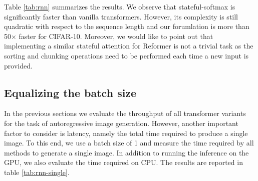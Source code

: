 \documentclass{article}
\begin{document}
Table \ref{tab:rnn} summarizes the results. We observe that stateful-softmax is
significantly faster than vanilla transformers. However, its complexity is
still quadratic with respect to the sequence length and our forumlation is more
than 50$\times$ faster for CIFAR-10. Moreover, we would like to point out that
implementing a similar stateful attention for Reformer is not a trivial task as
the sorting and chunking operations need to be performed each time a new input
is provided.

\subsection{Equalizing the batch size} \label{sec:imgen-discussion-2}

In the previous sections we evaluate the throughput of all transformer variants
for the task of autoregressive image generation. However, another important
factor to consider is latency, namely the total time required to produce a
single image. To this end, we use a batch size of 1 and measure the time
required by all methods to generate a single image. In addition to running the
inference on the GPU, we also evaluate the time required on CPU. The results
are reported in table \ref{tab:rnn-single}.
\end{document}
